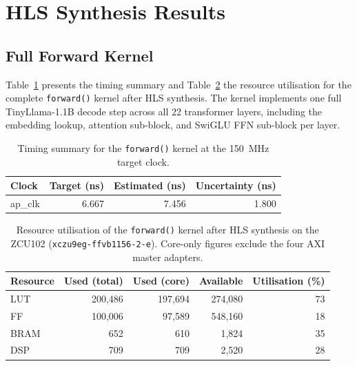 \section{HLS Synthesis Results}
\label{sec:synthesis_results}

\subsection{Full Forward Kernel}
\label{subsec:forward_synthesis}

Table~\ref{tab:forward_timing} presents the timing summary and
Table~\ref{tab:forward_resources} the resource utilisation for the complete
\texttt{forward()} kernel after HLS synthesis. The kernel implements one full
TinyLlama-1.1B decode step across all 22 transformer layers, including the
embedding lookup, attention sub-block, and SwiGLU FFN sub-block per layer.

\begin{table}[H]
  \centering
  \begin{tabular}{lrrr}
    \toprule
    Clock & Target (ns) & Estimated (ns) & Uncertainty (ns) \\
    \midrule
    ap\_clk & 6.667 & 7.456 & 1.800 \\
    \bottomrule
  \end{tabular}
  \caption{Timing summary for the \texttt{forward()} kernel at the
           \SI{150}{\mega\hertz} target clock.}
  \label{tab:forward_timing}
\end{table}

\begin{table}[H]
  \centering
  \begin{tabular}{lrrrr}
    \toprule
    Resource & Used (total) & Used (core) & Available & Utilisation (\%) \\
    \midrule
    LUT  & 200{,}486 & 197{,}694 & 274{,}080 & 73 \\
    FF   & 100{,}006 &  97{,}589 & 548{,}160 & 18 \\
    BRAM &       652 &       610 &   1{,}824 & 35 \\
    DSP  &       709 &       709 &   2{,}520 & 28 \\
    \bottomrule
  \end{tabular}
  \caption{Resource utilisation of the \texttt{forward()} kernel after HLS
           synthesis on the ZCU102 (\texttt{xczu9eg-ffvb1156-2-e}).
           Core-only figures exclude the four AXI master adapters.}
  \label{tab:forward_resources}
\end{table}

